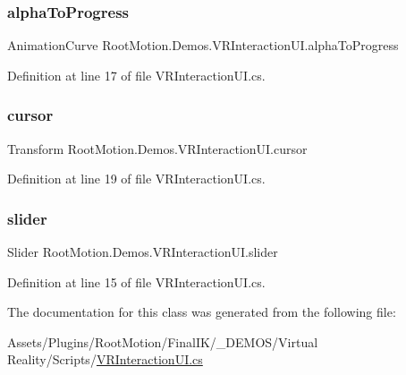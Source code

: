 \subsubsection{\texorpdfstring{alpha\+To\+Progress}{alphaToProgress}}
{\footnotesize\ttfamily Animation\+Curve Root\+Motion.\+Demos.\+V\+R\+Interaction\+U\+I.\+alpha\+To\+Progress}



Definition at line 17 of file V\+R\+Interaction\+U\+I.\+cs.

\mbox{\label{class_root_motion_1_1_demos_1_1_v_r_interaction_u_i_a991027af5b2b34830d8cf935dbbeb0dd}} 
\subsubsection{\texorpdfstring{cursor}{cursor}}
{\footnotesize\ttfamily Transform Root\+Motion.\+Demos.\+V\+R\+Interaction\+U\+I.\+cursor}



Definition at line 19 of file V\+R\+Interaction\+U\+I.\+cs.

\mbox{\label{class_root_motion_1_1_demos_1_1_v_r_interaction_u_i_ab1fbf750c895e6f3aef85b5624b15a54}} 
\subsubsection{\texorpdfstring{slider}{slider}}
{\footnotesize\ttfamily Slider Root\+Motion.\+Demos.\+V\+R\+Interaction\+U\+I.\+slider}



Definition at line 15 of file V\+R\+Interaction\+U\+I.\+cs.



The documentation for this class was generated from the following file\+:\begin{DoxyCompactItemize}
\item 
Assets/\+Plugins/\+Root\+Motion/\+Final\+I\+K/\+\_\+\+D\+E\+M\+O\+S/\+Virtual Reality/\+Scripts/\mbox{\hyperlink{_v_r_interaction_u_i_8cs}{V\+R\+Interaction\+U\+I.\+cs}}\end{DoxyCompactItemize}
